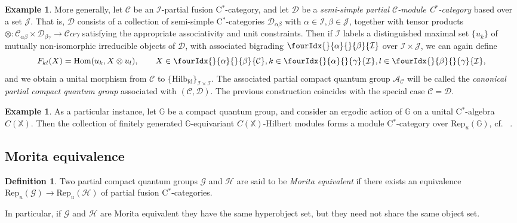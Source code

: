 \documentclass[10pt]{article}
\DeclareMathOperator{\fin}{\mathrm{fd}}
\DeclareMathOperator{\Hom}{Hom}
\newcommand{\G}{\mathbb{G}}
\newcommand{\CatC}{\mathcal{C}}
\newcommand{\CatD}{\mathcal{D}}
\newcommand{\CatCC}{\mathscr{C}}
\newcommand{\CatDD}{\mathscr{D}}
\newcommand{\Hilb}{\mathrm{Hilb}}
\newcommand{\Rep}{\mathrm{Rep}}
\newcommand{\Gr}[5]{\fourIdx{#2}{#4}{#3}{#5}{#1}}%
\newcommand{\Gru}[3]{\Gr{#1}{}{}{#2}{#3}}
\theoremstyle{definition}
\newtheorem{Def}[Theorem]{Definition}
\newtheorem{Exa}[Theorem]{Example}
\numberwithin{equation}{section}
\begin{document}
\begin{Exa} More generally, let $\CatCC$ be an $\mathscr{I}$-partial fusion C$^*$-category, and let $\CatDD$ be a \emph{semi-simple partial $\CatCC$-module C$^*$-category} based over a set $\mathscr{J}$. That is, $\CatDD$ consists of a collection of semi-simple C$^*$-categories $\CatD_{\alpha\beta}$ with $\alpha\in \mathscr{I},\beta\in \mathscr{J}$, together with tensor products $\otimes: \CatC_{\alpha\beta}\times \CatD_{\beta\gamma}\rightarrow \CatC{\alpha\gamma}$ satisfying the appropriate associativity and unit constraints. Then if $\mathcal{I}$ labels a distinguished maximal set $\{u_k\}$ of mutually non-isomorphic irreducible objects of $\CatD$, with associated bigrading $\Gru{\mathcal{I}}{\alpha}{\beta}$ over $\mathscr{I}\times \mathscr{J}$, we can again define \[F_{kl}(X)  = \Hom(u_k,  X\otimes u_l),\qquad X\in \Gru{\CatC}{\alpha}{\beta}, k\in \Gru{\mathcal{I}}{\alpha}{\gamma},l\in \Gru{\mathcal{I}}{\beta}{\gamma},\] and we obtain a unital morphism from $\CatCC$ to $\{\Hilb_{\fin}\}_{\mathcal{I}\times \mathcal{I}}$. The associated partial compact quantum group $\mathscr{A}_{\CatCC}$ will be called the \emph{canonical partial compact quantum group} associated with $(\CatCC,\CatDD)$. The previous construction coincides with the special case $\CatCC= \CatDD$.
\end{Exa}

\begin{Exa}\label{ExaErgo} As a particular instance, let $\G$ be a compact quantum group, and consider an ergodic action of $\G$ on a unital C$^*$-algebra $C(\mathbb{X})$. Then the collection of finitely generated $\G$-equivariant $C(\mathbb{X})$-Hilbert modules forms a module C$^*$-category over $\Rep_u(\G)$, cf.~ \cite{DCY1}. 
\end{Exa}

\subsection{Morita equivalence}


\begin{Def} Two partial compact quantum groups $\mathscr{G}$ and $\mathscr{H}$ are said to be \emph{Morita equivalent} if there exists an equivalence $\Rep_u(\mathscr{G}) \rightarrow \Rep_u(\mathscr{H})$ of partial fusion C$^*$-categories. 
\end{Def} 

In particular, if $\mathscr{G}$ and $\mathscr{H}$ are Morita equivalent they have the same hyperobject set, but they need not share the same object set.
\end{document}
